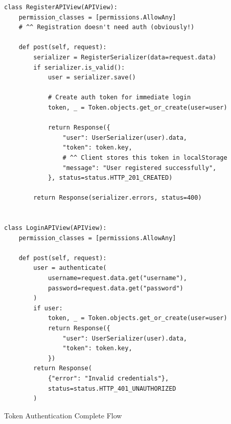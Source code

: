 \documentclass[11pt,a4paper,twoside]{report}
\begin{document}
\begin{lstlisting}[style=pythonstyle,caption={views.py --- Registration + Login}]
class RegisterAPIView(APIView):
    permission_classes = [permissions.AllowAny]
    # ^^ Registration doesn't need auth (obviously!)

    def post(self, request):
        serializer = RegisterSerializer(data=request.data)
        if serializer.is_valid():
            user = serializer.save()

            # Create auth token for immediate login
            token, _ = Token.objects.get_or_create(user=user)

            return Response({
                "user": UserSerializer(user).data,
                "token": token.key,
                # ^^ Client stores this token in localStorage
                "message": "User registered successfully",
            }, status=status.HTTP_201_CREATED)

        return Response(serializer.errors, status=400)


class LoginAPIView(APIView):
    permission_classes = [permissions.AllowAny]

    def post(self, request):
        user = authenticate(
            username=request.data.get("username"),
            password=request.data.get("password")
        )
        if user:
            token, _ = Token.objects.get_or_create(user=user)
            return Response({
                "user": UserSerializer(user).data,
                "token": token.key,
            })
        return Response(
            {"error": "Invalid credentials"},
            status=status.HTTP_401_UNAUTHORIZED
        )
\end{lstlisting}

\begin{conceptbox}{Token Authentication Complete Flow}
\begin{center}
\end{center}
\end{conceptbox}
\end{document}
